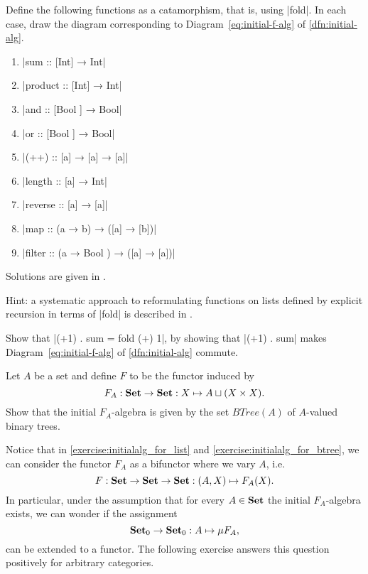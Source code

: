 \begin{exer}\label{exer:list-functions-as-fold}
  Define the following functions as a catamorphism, that is, using |fold|.
  In each case, draw the diagram corresponding to Diagram~\ref{eq:initial-f-alg} of \cref{dfn:initial-alg}.
  \begin{enumerate}
  \item |sum :: [Int] →  Int|
  \item |product :: [Int] →  Int|
  \item |and :: [Bool ] →  Bool|
  \item |or :: [Bool ] →  Bool|
  \item |(++) :: [a] →  [a] →  [a]|
  \item |length :: [a] →  Int|
  \item |reverse :: [a] →  [a]|
  \item |map :: (a →  b) →  ([a] →  [b])|
  \item |filter :: (a →  Bool ) →  ([a] →  [a])|
  \end{enumerate}
  Solutions are given in \cite[\S2]{DBLP:journals/jfp/Hutton99}.

  Hint: a systematic approach to reformulating functions on lists defined by explicit recursion in terms of |fold| is described in \cite[\S3.3]{DBLP:journals/jfp/Hutton99}.
\end{exer}


\begin{exer}
  Show that |(+1) . sum = fold (+) 1|, by showing that |(+1) . sum| makes Diagram~\ref{eq:initial-f-alg} of \cref{dfn:initial-alg} commute.
\end{exer}




\begin{exer}\label{exercise:initialalg_for_btree} Let $A$ be a set and define $F$ to be the functor induced by 
\[
F_A:\mathbf{Set}\to\mathbf{Set} : X\mapsto A \sqcup (X\times X).
\]
Show that the initial $F_A$-algebra is given by the set $BTree(A)$ of $A$-valued binary trees.
\end{exer}

\begin{rem} Notice that in \cref{exercise:initialalg_for_list} and \cref{exercise:initialalg_for_btree}, we can consider the functor $F_A$ as a bifunctor where we vary $A$, i.e.
\[
F: \mathbf{Set}\to \mathbf{Set}\to \mathbf{Set}: (A,X)\mapsto F_A(X).
\]
In particular, under the assumption that for every $A\in\mathbf{Set}$ the initial $F_A$-algebra exists, we can wonder if the assignment 
\[
{\mathbf{Set}}_0 \to {\mathbf{Set}}_0 : A\mapsto \mu F_A ,
\]
can be extended to a functor. The following exercise answers this question positively for arbitrary categories.
\end{rem}

